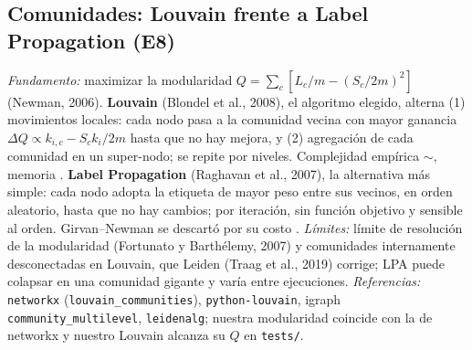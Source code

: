 \subsection{Comunidades: Louvain frente a Label Propagation (E8)}
\emph{Fundamento:} maximizar la modularidad $Q=\sum_c\left[L_c/m-(S_c/2m)^2\right]$ (Newman, 2006). \textbf{Louvain} (Blondel et al., 2008), el algoritmo
elegido, alterna (1) movimientos locales: cada nodo pasa a la comunidad vecina con mayor ganancia $\Delta Q\propto k_{i,c}-S_c k_i/2m$ hasta que no hay mejora, y
(2) agregación de cada comunidad en un super-nodo; se repite por niveles. Complejidad empírica $\sim$, memoria .
\textbf{Label Propagation} (Raghavan et al., 2007), la alternativa más simple: cada nodo adopta la etiqueta de mayor peso entre sus vecinos, en orden aleatorio,
hasta que no hay cambios;  por iteración, sin función objetivo y sensible al orden. Girvan–Newman se descartó por su costo .
\emph{Límites:} límite de resolución de la modularidad (Fortunato y Barthélemy, 2007) y comunidades internamente desconectadas en Louvain, que Leiden
(Traag et al., 2019) corrige; LPA puede colapsar en una comunidad gigante y varía entre ejecuciones. \emph{Referencias:} \texttt{networkx} (\texttt{louvain\_communities}),
\texttt{python-louvain}, igraph \texttt{community\_multilevel}, \texttt{leidenalg}; nuestra modularidad coincide con la de networkx y nuestro Louvain alcanza
su $Q$ en \texttt{tests/}.
